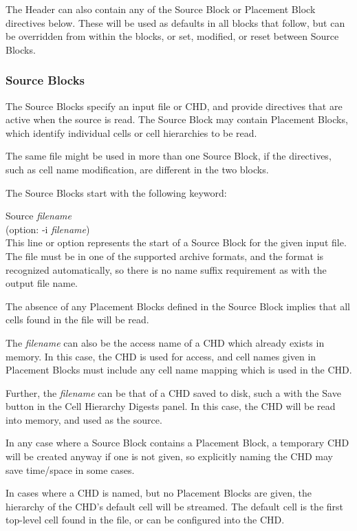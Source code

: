 The Header can also contain any of the Source Block or Placement Block
directives below.  These will be used as defaults in all blocks that
follow, but can be overridden from within the blocks, or set,
modified, or reset between Source Blocks.

\subsubsection{Source Blocks}

The Source Blocks specify an input file or CHD, and provide directives
that are active when the source is read.  The Source Block may contain
Placement Blocks, which identify individual cells or cell hierarchies
to be read.

The same file might be used in more than one Source Block, if the
directives, such as cell name modification, are different in the two
blocks.

The Source Blocks start with the following keyword:

\begin{description}
\item{\vt Source} {\it filename}\\
(option: {\vt -i} {\it filename})\\
This line or option represents the start of a Source Block for the
given input file.  The file must be in one of the supported archive
formats, and the format is recognized automatically, so there is no
name suffix requirement as with the output file name.

The absence of any Placement Blocks defined in the Source Block
implies that all cells found in the file will be read.

The {\it filename} can also be the access name of a CHD which already
exists in memory.  In this case, the CHD is used for access, and cell
names given in Placement Blocks must include any cell name mapping
which is used in the CHD.

Further, the {\it filename} can be that of a CHD saved to disk, such a
with the {\cb Save} button in the {\cb Cell Hierarchy Digests} panel. 
In this case, the CHD will be read into memory, and used as the
source.

In any case where a Source Block contains a Placement Block, a
temporary CHD will be created anyway if one is not given, so
explicitly naming the CHD may save time/space in some cases.

In cases where a CHD is named, but no Placement Blocks are given, the
hierarchy of the CHD's default cell will be streamed.  The default
cell is the first top-level cell found in the file, or can be
configured into the CHD.
\end{description}

